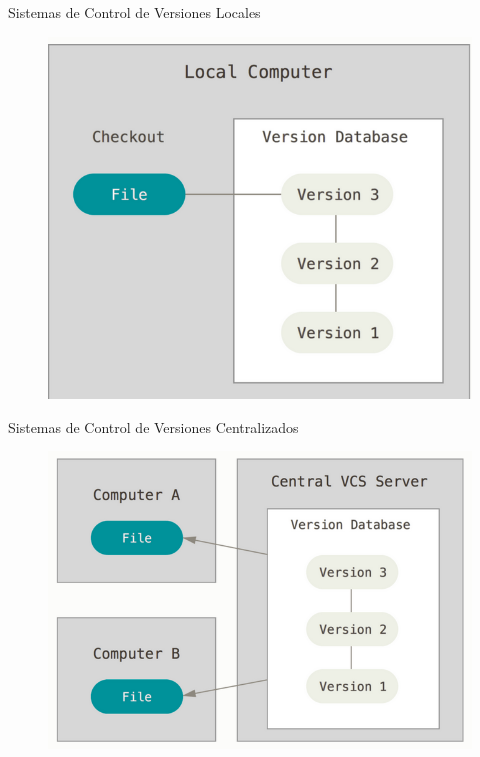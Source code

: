 \documentclass{beamer}
\begin{document}
\begin{frame}{Sistemas de Control de Versiones Locales}
	\begin{figure}
		\centering
		\includegraphics[width=0.7\linewidth]{img/local}
		\label{fig:local}
	\end{figure}
\end{frame}

\begin{frame}{Sistemas de Control de Versiones Centralizados}
	\begin{figure}
		\centering
		\includegraphics[width=0.7\linewidth]{img/central}
		\label{fig:central}
	\end{figure}
\end{frame}
\end{document}
